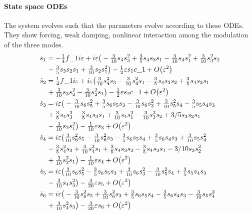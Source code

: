 \paragraph{State space ODEs}
The system evolves such
that the parameters evolve according to these ODEs.  They show forcing, weak damping, nonlinear interaction among the modulation of the three modes.
\begin{align*}&
\dot s_{1}=-\tfrac{1}{4} f\_1 i \varepsilon+i \varepsilon \big(-\tfrac{3}{10} s_{4} s_{3}^{2}+\tfrac{3}{5} s_{4} 
s_{3} s_{1}-\tfrac{3}{10} s_{4} s_{1}^{2}+\tfrac{3}{10} s_{3}^{2} s_{2}
\\&\quad{}
-\tfrac{3}{5} s_{3} s_{2} s_
{1}+\tfrac{3}{10} s_{2} s_{1}^{2}\big)-\tfrac{1}{2} \varepsilon s_{1} c\_1+O\big(\varepsilon ^{2}
\big)
\\&
\dot s_{2}=\tfrac{1}{4} f\_1 i \varepsilon+i \varepsilon \big(\tfrac{3}{10} s_{4}^{2} s_{3}-\tfrac{3}{10} s_{4}^{
2} s_{1}-\tfrac{3}{5} s_{4} s_{3} s_{2}+\tfrac{3}{5} s_{4} s_{2} s_{1}
\\&\quad{}
+\tfrac{3}{10} s_{3} s_{2}^{2
}-\tfrac{3}{10} s_{2}^{2} s_{1}\big)-\tfrac{1}{2} \varepsilon s_{2} c\_1+O\big(\varepsilon ^{2}
\big)
\\&
\dot s_{3}=i \varepsilon \big(-\tfrac{3}{10} s_{6} s_{5}^{2}+\tfrac{3}{5} s_{6} s_{5} s_{3}-\tfrac{3}{10} 
s_{6} s_{3}^{2}+\tfrac{3}{10} s_{5}^{2} s_{4}-\tfrac{3}{5} s_{5} s_{4} s_{3}
\\&\quad{}
+\tfrac{3}{5} s_{4} s_{
3}^{2}-\tfrac{3}{5} s_{4} s_{3} s_{1}+\tfrac{3}{10} s_{4} s_{1}^{2}
-\tfrac{3}{10} s_{3}^{2} s_{2}+3
/5 s_{3} s_{2} s_{1}
\\&\quad{}
-\tfrac{3}{10} s_{2} s_{1}^{2}\big)-\tfrac{1}{10} \varepsilon s_{3}+O\big(
\varepsilon ^{2}\big)
\\&
\dot s_{4}=i \varepsilon \big(\tfrac{3}{10} s_{6}^{2} s_{5}-\tfrac{3}{10} s_{6}^{2} s_{3}-\tfrac{3}{5} s_{
6} s_{5} s_{4}+\tfrac{3}{5} s_{6} s_{4} s_{3}+\tfrac{3}{10} s_{5} s_{4}^{2}
\\&\quad{}
-\tfrac{3}{5} s_{4}^{2} 
s_{3}+\tfrac{3}{10} s_{4}^{2} s_{1}+\tfrac{3}{5} s_{4} s_{3} s_{2}-\tfrac{3}{5} s_{4} s_{2} s_{1}-3
/10 s_{3} s_{2}^{2}
\\&\quad{}
+\tfrac{3}{10} s_{2}^{2} s_{1}\big)-\tfrac{1}{10} \varepsilon s_{4}+O\big(
\varepsilon ^{2}\big)
\\&
\dot s_{5}=i \varepsilon \big(\tfrac{3}{10} s_{6} s_{5}^{2}-\tfrac{3}{5} s_{6} s_{5} s_{3}+\tfrac{3}{10} s
_{6} s_{3}^{2}-\tfrac{3}{10} s_{5}^{2} s_{4}+\tfrac{3}{5} s_{5} s_{4} s_{3}
\\&\quad{}
-\tfrac{3}{10} s_{4} s_{
3}^{2}\big)-\tfrac{3}{20} \varepsilon s_{5}+O\big(\varepsilon ^{2}\big)
\\&
\dot s_{6}=i \varepsilon \big(-\tfrac{3}{10} s_{6}^{2} s_{5}+\tfrac{3}{10} s_{6}^{2} s_{3}+\tfrac{3}{5} s_
{6} s_{5} s_{4}-\tfrac{3}{5} s_{6} s_{4} s_{3}-\tfrac{3}{10} s_{5} s_{4}^{2}
\\&\quad{}
+\tfrac{3}{10} s_{4}^{2
} s_{3}\big)-\tfrac{3}{20} \varepsilon s_{6}+O\big(\varepsilon ^{2}\big)
\end{align*}






